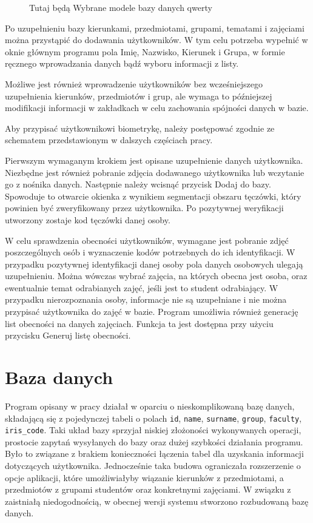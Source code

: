 \begin{figure}
\begin{center}
\caption{Tutaj będą Wybrane modele bazy danych qwerty}
\label{fig:wybraneTabele}
\end{center}
\end{figure}

Po uzupełnieniu bazy kierunkami, przedmiotami, grupami, tematami i zajęciami można przystąpić do dodawania użytkowników. W tym celu potrzeba wypełnić w oknie głównym programu pola Imię, Nazwisko, Kierunek i Grupa, w formie ręcznego wprowadzania danych bądź wyboru informacji z listy.

Możliwe jest również wprowadzenie użytkowników bez wcześniejszego uzupełnienia kierunków, przedmiotów i grup, ale wymaga to późniejszej modifikacji informacji w zakładkach w celu zachowania spójności danych w bazie.

Aby przypisać użytkownikowi biometrykę, należy postępować zgodnie ze schematem przedstawionym w dalszych częściach pracy.

Pierwszym wymaganym krokiem jest opisane uzupełnienie danych użytkownika. Niezbędne jest również pobranie zdjęcia dodawanego użytkownika lub wczytanie  go z nośnika danych. Następnie należy wcisnąć przycisk Dodaj do bazy. Spowoduje to otwarcie okienka z wynikiem segmentacji obszaru tęczówki, który powinien być zweryfikowany przez użytkownika. Po pozytywnej weryfikacji utworzony zostaje kod tęczówki danej osoby.

W celu sprawdzenia obecności użytkowników, wymagane jest pobranie zdjęć poszczególnych osób i wyznaczenie kodów potrzebnych do ich identyfikacji. W przypadku pozytywnej identyfikacji danej osoby pola danych osobowych ulegają uzupełnieniu. Można wówczas wybrać zajęcia, na których obecna jest osoba, oraz ewentualnie temat odrabianych zajęć, jeśli jest to student odrabiający. W przypadku nierozpoznania osoby, informacje nie są uzupełniane i nie można przypisać użytkownika do zajęć w bazie.
Program umożliwia również generację list obecności na danych zajęciach. Funkcja ta jest dostępna przy użyciu przycisku Generuj listę obecności.
\section{Baza danych}
\label{sec:bazadanych}

Program opisany w pracy \cite{Gl11} działał w oparciu o nieskomplikowaną bazę danych, składającą się z pojedynczej tabeli o polach \verb!id!, \verb!name!, \verb!surname!, \verb!group!, \verb!faculty!, \verb!iris_code!. Taki układ bazy sprzyjał niskiej złożoności wykonywanych operacji, prostocie zapytań wysyłanych do bazy oraz dużej szybkości działania programu. Było to związane z brakiem konieczności łączenia tabel dla uzyskania informacji dotyczących użytkownika. Jednocześnie taka budowa ograniczała rozszerzenie o opcje aplikacji, które umożliwiałyby wiązanie kierunków z przedmiotami, a przedmiotów z grupami studentów oraz konkretnymi zajęciami. W związku z zaistniałą niedogodnością, w obecnej wersji systemu stworzono rozbudowaną bazę danych.

